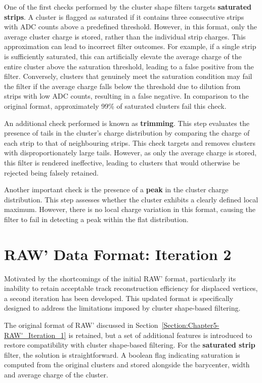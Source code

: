 One of the first checks performed by the cluster shape filters targets \textbf{saturated strips}. A cluster is flagged as saturated if it contains three consecutive strips with ADC counts above a predefined threshold. However, in this format, only the average cluster charge is stored, rather than the individual strip charges. This approximation can lead to incorrect filter outcomes. For example, if a single strip is sufficiently saturated, this can artificially elevate the average charge of the entire cluster above the saturation threshold, leading to a false positive from the filter. Conversely, clusters that genuinely meet the saturation condition may fail the filter if the average charge falls below the threshold due to dilution from strips with low ADC counts, resulting in a false negative. In comparison to the original format, approximately 99\% of saturated clusters fail this check.

An additional check performed is known as \textbf{trimming}. This step evaluates the presence of tails in the cluster's charge distribution by comparing the charge of each strip to that of neighbouring strips.  This check targets and removes clusters with disproportionately large tails. However, as only the average charge is stored, this filter is rendered ineffective, leading to clusters that would otherwise be rejected being falsely retained. 

Another important check is the presence of a \textbf{peak} in the cluster charge distribution. This step assesses whether the cluster exhibits a clearly defined local maximum. However, there is no local charge variation in this format, causing the filter to fail in detecting a peak within the flat distribution.

\section{RAW' Data Format: Iteration 2}

Motivated by the shortcomings of the initial RAW' format, particularly its inability to retain acceptable track reconstruction efficiency for displaced vertices, a second iteration has been developed. This updated format is specifically designed to address the limitations imposed by cluster shape-based filtering.

The original format of RAW' discussed in Section~\ref{Section:Chapter5-RAW'_Iteration_1} is retained, but a set of additional features is introduced to restore compatibility with cluster shape-based filtering. For the \textbf{saturated strip} filter, the solution is straightforward. A boolean flag indicating saturation is computed from the original clusters and stored alongside the barycenter, width and average charge of the cluster. 

